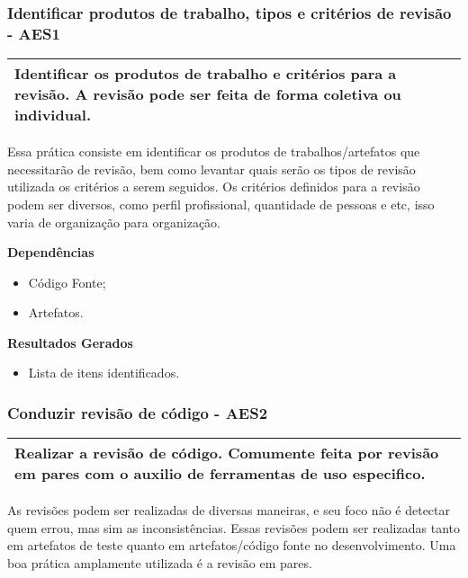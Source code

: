 \subsubsection{Identificar produtos de trabalho, tipos e critérios de revisão - AES1}
\label{sec:aes1}

\begin{table}[H]
\centering
\begin{tabular}{|p{130mm}|}
\hline
Identificar os produtos de trabalho e critérios para a revisão. A revisão pode ser feita de forma coletiva ou individual. \\ 
\hline
\end{tabular}
\end{table}

Essa prática consiste em identificar os produtos de trabalhos/artefatos que necessitarão de revisão, bem como levantar quais serão os tipos de revisão utilizada os critérios a serem seguidos. Os critérios definidos para a revisão podem ser diversos, como perfil profissional, quantidade de pessoas e etc, isso varia de organização para organização.

\textbf{Dependências}
\begin{itemize}
    \item Código Fonte;
    \item Artefatos.
\end{itemize}


\textbf{Resultados Gerados}
\begin{itemize}
    \item Lista de itens identificados.
\end{itemize}

\subsubsection{Conduzir revisão de código - AES2}
\label{sec:aes2}

\begin{table}[H]
\centering
\begin{tabular}{|p{130mm}|}
\hline
Realizar a revisão de código. Comumente feita por revisão em pares com o auxilio de ferramentas de uso especifico. \\
\hline
\end{tabular}
\end{table}

As revisões podem ser realizadas de diversas maneiras, e seu foco não é detectar quem errou, mas sim as inconsistências. Essas revisões podem ser realizadas tanto em artefatos de teste quanto em artefatos/código fonte no desenvolvimento. Uma boa prática amplamente utilizada é a revisão em pares.

